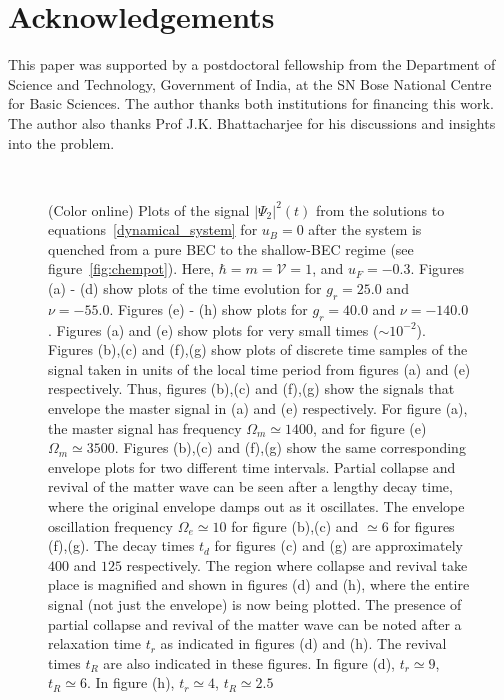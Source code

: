 \documentclass[a4paper,10pt]{article}
\begin{document}
\section{Acknowledgements}
This paper was supported by a postdoctoral fellowship from the Department of Science and Technology, Government of India,  at the SN Bose National Centre for Basic Sciences. The author thanks both institutions for financing this work. The author also thanks Prof J.K. Bhattacharjee for his discussions and insights into the problem.
\begin{figure}[h!bt]
\hspace*{-0.3in}
\ 
\caption{(Color online) Plots of the signal $|\Psi_2|^2(t)$  from the solutions to equations~\ref{dynamical_system} for $u_B = 0$ after the system is quenched from a pure BEC to the shallow-BEC regime (see figure~\ref{fig:chempot}). Here, $\hbar = m =\mathcal{V} = 1$, and $u_F = -0.3$. Figures (a) - (d) show plots of the time evolution for $g_r=25.0$ and $\nu = -55.0$. Figures (e) - (h) show plots for $g_r=40.0$ and $\nu = -140.0$. Figures (a) and (e) show plots for very small times ($\sim 10^{-2}$). Figures (b),(c) and (f),(g) show plots of discrete time samples of the signal taken in units of the local time period from figures (a) and (e) respectively. Thus, figures (b),(c) and (f),(g) show the signals that envelope the master signal in (a) and (e) respectively. For figure (a), the master signal has frequency $\Omega_m \simeq 1400$, and for figure (e) $\Omega_m \simeq 3500$. Figures (b),(c) and (f),(g) show the same corresponding envelope plots for two different time intervals. Partial collapse and revival of the matter wave can be seen after a lengthy decay time, where the original envelope damps out as it oscillates. The envelope oscillation frequency $\Omega_e \simeq 10$ for figure (b),(c) and $\simeq 6$ for figures (f),(g). The decay times $t_d$ for figures (c) and (g) are approximately $400$ and $125$ respectively. The region where collapse and revival take place is magnified and shown in figures (d) and (h), where the entire signal (not just the envelope) is now being plotted. The presence of partial collapse and revival of the matter wave can be noted after a relaxation time $t_r$ as indicated in figures (d) and (h). The revival times $t_R$ are also indicated in these figures. In figure (d), $t_r\simeq9$, $t_R\simeq6$. In figure (h), $t_r\simeq4$, $t_R\simeq2.5$}
\label{fig:colrev}
\end{figure}
\pagebreak
\end{document}
